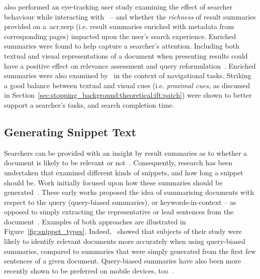 \cite{marcos2015snippets_web_search} also performed an eye-tracking user study examining the effect of searcher behaviour while interacting with~ -- and whether the \emph{richness} of result summaries provided on a~\gls{acr:serp} (i.e. result summaries enriched with metadata from corresponding pages) impacted upon the user's search experience. Enriched summaries were found to help capture a searcher's attention. Including both textual and visual representations of a document when presenting results could have a positive effect on relevance assessment and query reformulation~\citep{joho2006presentation}. Enriched summaries were also examined by~\cite{ali2009interaction_interfaces} in the context of navigational tasks. Striking a good balance between textual and visual cues (i.e. \emph{proximal cues,} as discussed in Section~\ref{sec:stopping_background:theoretical:ift:patch}) were shown to better support a searcher's tasks, and search completion time.

\subsection{Generating Snippet Text}
Searchers can be provided with an insight by result summaries as to whether a document is likely to be relevant or not~\cite{he2012bridging}. Consequently, research has been undertaken that examined different kinds of snippets, and how long a snippet should be. Work initially focused upon how these summaries should be generated~\citep{pedersen1991snippet, landauer1993enhancing, tombros1998query_biased, white2003task, leal2015query}. These early works proposed the idea of summarising documents with respect to the query (query-biased summaries), or keywords-in-context -- as opposed to simply extracting the representative or lead sentences from the document~\citep{kupiec1995tds}. Examples of both approaches are illustrated in Figure~\ref{fig:snippet_types}. Indeed,~\cite{tombros1998query_biased} showed that subjects of their study were likely to identify relevant documents more accurately when using query-biased summaries, compared to summaries that were simply generated from the first few sentences of a given document. Query-biased summaries have also been more recently shown to be preferred on mobile devices, too~\citep{spirin2016snippets}.

